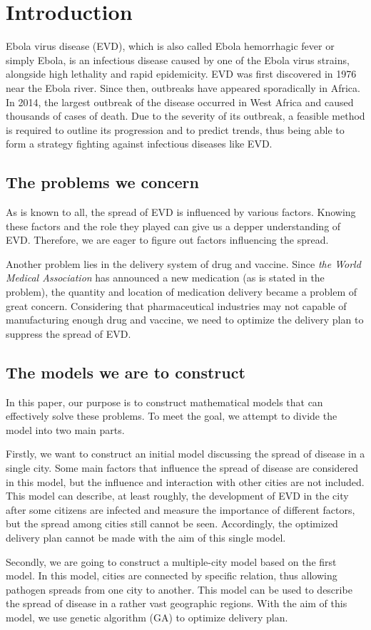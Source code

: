 \section{Introduction}

\par Ebola virus disease (EVD), which is also called Ebola hemorrhagic fever or simply Ebola, is an infectious disease caused by one of the Ebola virus strains, alongside high lethality and rapid epidemicity. EVD was first discovered in 1976 near the Ebola river. Since then, outbreaks have appeared sporadically in Africa. In 2014, the largest outbreak of the disease occurred in West Africa and caused thousands of cases of death.\cite{CDC} Due to the severity of its outbreak, a feasible method is required to outline its progression and to predict trends, thus being able to form a strategy fighting against infectious diseases like EVD.
\subsection{The problems we concern}
As is known to all, the spread of EVD is influenced by various factors. Knowing these factors and the role they played can give us a depper understanding of EVD. Therefore, we are eager to figure out factors influencing the spread.

Another problem lies in the delivery system of drug and vaccine. Since \emph{the World Medical Association} has announced a new medication (as is stated in the problem), the quantity and location of medication delivery became a problem of great concern. Considering that pharmaceutical industries may not capable of manufacturing enough drug and vaccine, we need to optimize the delivery plan to suppress the spread of EVD.

\subsection{The models we are to construct}
In this paper, our purpose is to construct mathematical models that can effectively solve these problems. To meet the goal, we attempt to divide the model into two main parts.

Firstly, we want to construct an initial model discussing the spread of disease in a single city. Some main factors that influence the spread of disease are considered in this model, but the influence and interaction with other cities are not included. This model can describe, at least roughly, the development of EVD in the city after some citizens are infected and measure the importance of different factors, but the spread among cities still cannot be seen. Accordingly, the optimized delivery plan cannot be made with the aim of this single model.

Secondly, we are going to construct a multiple-city model based on the first model. In this model, cities are connected by specific relation, thus allowing pathogen spreads from one city to another. This model can be used to describe the spread of disease in a rather vast geographic regions. With the aim of this model, we use genetic algorithm (GA) to optimize delivery plan.

